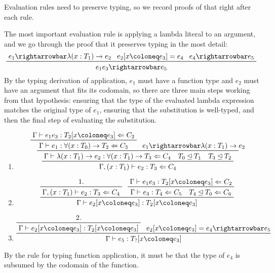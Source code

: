 \documentclass[11pt, twoside, reqno]{book}
\newcommand{\subsumedBy}{\unlhd}
\begin{document}
\begin{appdices}
Evaluation rules need to preserve typing, so we record proofs of that right after each rule.

The most important evaluation rule is applying a lambda literal to an argument, and we go through the proof that it preserves typing in the most detail:
\begin{displaymath}
\prftree{e_1 \rightarrowbar \lambda(x : T_1) \to e_2}{e_2[x \coloneq e_3] = e_4}{e_4 \rightarrowbar e_5}{e_1 e_3 \rightarrowbar e_5}
\end{displaymath}
By the typing derivation of application, \(e_1\) must have a function type and \(e_2\) must have an argument that fits its codomain, so there are three main steps working from that hypothesis: ensuring that the type of the evaluated lambda expression matches the original type of \(e_1\), ensuring that the substitution is well-typed, and then the final step of evaluating the substitution.
\begin{enumerate}
\item
\begin{displaymath}
\prftree
{\prftree
  {\prftree
    {\Gamma \vdash e_1 e_3 : T_2[x \coloneq e_3] \Leftarrow C_2}
    {\Gamma \vdash e_1 : \forall(x : T_0) \to T_2 \Leftarrow C_3}
  }
  {e_1 \rightarrowbar \lambda(x : T_1) \to e_2}
  {\Gamma \vdash \lambda(x : T_1) \to e_2 : \forall(x : T_1) \to T_3 \Leftarrow C_4 \quad T_0 \subsumedBy T_1 \quad T_3 \subsumedBy T_2}
}
{\Gamma, (x : T_1) \vdash e_2 : T_3 \Leftarrow C_4}
\end{displaymath}
\item
\begin{displaymath}
\prftree
  {\prftree{\text{1.}}
    {\Gamma, (x : T_1) \vdash e_2 : T_3 \Leftarrow C_4}
  }
  {\prftree
    {\Gamma \vdash e_1 e_3 : T_2[x \coloneq e_3] \Leftarrow C_2}
    {\Gamma \vdash e_3 : T_4 \Leftarrow C_5 \quad T_4 \subsumedBy T_0 \Leftarrow C_6}
  }
  {\Gamma \vdash e_2[x \coloneq e_3] : T_2[x \coloneq e_3]}
\end{displaymath}
\item
\begin{displaymath}
\prftree
  {\prftree{\text{2.}}
    {\Gamma \vdash e_2[x \coloneq e_3] : T_2[x \coloneq e_3]}
  }
  {e_2[x \coloneq e_3] = e_4 \rightarrowbar e_5}
  {\Gamma \vdash e_5 : T_?[x \coloneq e_3]}
\end{displaymath}
\end{enumerate}
By the rule for typing function application, it must be that the type of \(e_4\) is subsumed by the codomain of the function.


\end{appdices}
\end{document}
